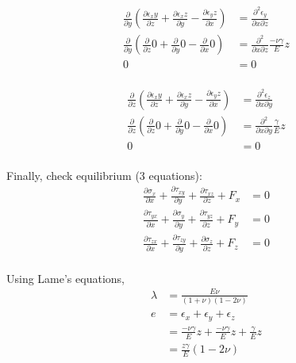 \[
\begin{aligned}
    \frac{\partial}{\partial y} \left(\frac{\partial \epsilon_xy}{\partial z}  + \frac{\partial \epsilon_xz}{\partial y} - 
    \frac{\partial \epsilon_yz}{\partial x}\right) &= \frac{\partial^2 \epsilon_y}{\partial x \partial z}\\
    \frac{\partial}{\partial y} \left(\frac{\partial}{\partial z} 0  + \frac{\partial}{\partial y} 0 - 
    \frac{\partial}{\partial x} 0\right) &= \frac{\partial^2}{\partial x \partial z} \frac{-\nu\gamma}{E} z \\
    0 &= 0 \\
\end{aligned}
\]

\[
\begin{aligned}
    \frac{\partial}{\partial z} \left(\frac{\partial \epsilon_xy}{\partial z}  + \frac{\partial \epsilon_xz}{\partial y} - 
    \frac{\partial \epsilon_yz}{\partial x}\right) &= \frac{\partial^2 \epsilon_z}{\partial x \partial y}\\
    \frac{\partial}{\partial z} \left(\frac{\partial}{\partial z} 0  + \frac{\partial}{\partial y} 0 - 
    \frac{\partial}{\partial x} 0\right) &= \frac{\partial^2}{\partial x \partial y} \frac{\gamma}{E} z \\
    0 &= 0 \\
\end{aligned}
\]

Finally, check equilibrium (3 equations):
\[
\begin{aligned}
    \frac{\partial \sigma_{x}}{\partial x} + \frac{\partial \tau_{xy}}{\partial y} + \frac{\partial \tau_{xz}}{\partial z} + F_x &= 0 \\
    \frac{\partial \tau_{yx}}{\partial x} + \frac{\partial \sigma_{y}}{\partial y} + \frac{\partial \tau_{yz}}{\partial z} + F_y &= 0 \\
    \frac{\partial \tau_{zx}}{\partial x} + \frac{\partial \tau_{zy}}{\partial y} + \frac{\partial \sigma_{z}}{\partial z} + F_z &= 0 \\
\end{aligned}
\]

Using Lame's equations,
\[
\begin{aligned}
    \lambda &=  \frac{E\nu}{(1 + \nu)(1 - 2\nu)} \\
    e &= \epsilon_x + \epsilon_y + \epsilon_z \\
    &= \frac{-\nu\gamma}{E} z + \frac{-\nu\gamma}{E} z + \frac{\gamma}{E} z \\
    &= \frac{z\gamma}{E} (1 - 2\nu) \\
\end{aligned}
\]

